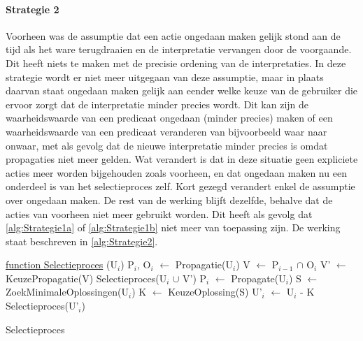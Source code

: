 \paragraph{Strategie 2}
Voorheen was de assumptie dat een actie ongedaan maken gelijk stond aan de tijd als het ware terugdraaien en de interpretatie vervangen door de voorgaande. Dit heeft niets te maken met de precisie ordening van de interpretaties. In deze strategie wordt er niet meer uitgegaan van deze assumptie, maar in plaats daarvan staat ongedaan maken gelijk aan eender welke keuze van de gebruiker die ervoor zorgt dat de interpretatie minder precies wordt. Dit kan zijn de waarheidswaarde van een predicaat ongedaan (minder precies) maken of een waarheidswaarde van een predicaat veranderen van bijvoorbeeld waar naar onwaar, met als gevolg dat de nieuwe interpretatie minder precies is omdat propagaties niet meer gelden. Wat verandert is dat in deze situatie geen expliciete acties meer worden bijgehouden zoals voorheen, en dat ongedaan maken nu een onderdeel is van het selectieproces zelf. Kort gezegd verandert enkel de assumptie over ongedaan maken. De rest van de werking blijft dezelfde, behalve dat de acties van voorheen niet meer gebruikt worden. Dit heeft als gevolg dat \ref{alg:Strategie1a} of \ref{alg:Strategie1b} niet meer van toepassing zijn. De werking staat beschreven in \ref{alg:Strategie2}. 

\begin{algorithm}
	\underline{function Selectieproces} (U$_{i}$)\;
	\Output{}
		{
		P$_{i}$, O$_{i}$ $\leftarrow$ Propagatie(U$_{i}$)\;
		V $\leftarrow$ P$_{i-1}$ $\cap$ O$_{i}$\;
			{
			V' $\leftarrow$ KeuzePropagatie(V)\; 
			Selectieproces(U$_{i}$ $\cup$ V')\;
			}
			{
			P$_{i}$ $\leftarrow$ Propagate(U$_{i}$)\;	
			}
		}
		{
		S $\leftarrow$ ZoekMinimaleOplossingen(U$_{i}$)\; 
		K $\leftarrow$ KeuzeOplossing(S)\; 
		U'$_{i}$ $\leftarrow$ U$_{i}$ - K\; 
		Selectieproces(U'$_{i}$)\;
		}
	\caption{Selectieproces\label{alg:Strategie2}}
\end{algorithm}

